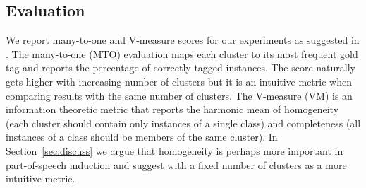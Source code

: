 \subsection{Evaluation}

We report many-to-one and V-measure scores for our experiments as
suggested in \cite{Christodoulopoulos:2010:TDU:1870658.1870714}.  The
many-to-one (MTO) evaluation maps each cluster to its most frequent
gold tag and reports the percentage of correctly tagged instances.
The \mto score naturally gets higher with increasing number of
clusters but it is an intuitive metric when comparing results with the
same number of clusters.  The V-measure (VM) \cite{rosenberg2007v} is
an information theoretic metric that reports the harmonic mean of
homogeneity (each cluster should contain only instances of a single
class) and completeness (all instances of a class should be members of
the same cluster).  In Section~\ref{sec:discuss} we argue that
homogeneity is perhaps more important in part-of-speech induction and
suggest \mto with a fixed number of clusters as a more intuitive
metric.

